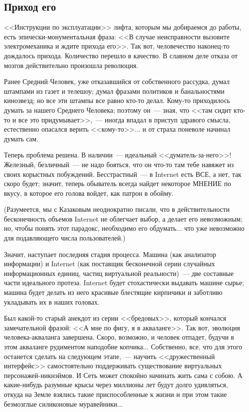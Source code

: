 \documentclass{scrbook}
\newcommand{\flqq}{<<}
\newcommand{\frqq}{>>}
\newcommand{\mdash}{~--- }
\newcommand{\commamdash}{~--- } %
\newcommand{\essaysection}[1]{\subsection*{#1}\nopagebreak}
\begin{document}
\essaysection{Приход его}

{\flqq}Инструкции по эксплуатации{\frqq} лифта, которым мы добираемся до работы, есть эпически-монументальная фраза: {\flqq}В случае неисправности вызовите электромеханика и ждите прихода его{\frqq}. Так вот, человечество наконец-то дождалось прихода. Количество перешло в качество. В славном деле отказа от мозгов действительно произошла революция.

Ранее Средний Человек, уже отказавшийся от собственного рассудка, думал штампами из газет и телешоу; думал фразами политиков и банальностями кинозвезд; но все эти штампы все равно кто-то делал. Кому-то приходилось думать за нашего Среднего Человека; поэтому он{\mdash}зная, что {\flqq}там сидит кто-то и все это придумывает{\frqq},{\commamdash}иногда впадал в приступ здравого смысла, естественно опасался верить {\flqq}кому-то{\frqq}... и от страха поневоле начинал думать сам.

Теперь проблема решена. В наличии{\mdash}идеальный {\flqq}думатель-за-него{\frqq}! Железный, безличный{\mdash}не надо бояться, что он что-то там тебе навяжет из своих корыстных побуждений. Бесстрастный{\mdash}в Internet есть ВСЕ, а нет, так скоро будет; значит, теперь обыватель всегда найдет некоторое МНЕНИЕ по вкусу, в которое его голова войдет, как патрон в обойму.

(Разумеется, мы с Казаковым неоднократно писали, что в действительности бесконечность объемов Internet не облегчает выбор, а делает его невозможным; но, чтобы понять этот парадокс, необходимо его обдумать... что уже невозможно для подавляющего числа пользователей.)

Значит, наступает последняя стадия процесса. Машина (как анализатор информации) и Internet (как поставщик бесконечной серии случайных информационных единиц, частиц виртуальной реальности){\mdash}две составные части идеального протеза. Internet будет стохастически выдавать машине сырье; машина будет делать из него красивые блестящие кирпичики и заботливо укладывать их в наших головах.

Был какой-то старый анекдот из серии {\flqq}бредовых{\frqq}, который кончался замечательной фразой: {\flqq}А мне по фигу, я в акваланге{\frqq}. Так вот, эволюция человека-акваланга завершена. Скоро, возможно, и человек отпадет, будучи в этом акваланге рудиментом наподобие копчика... Собственно, все, что для этого останется сделать на следующем этапе,{\commamdash}научить {\flqq}дружественный интерфейс{\frqq} самостоятельно поддерживать существование виртуальных персонажей-никнэймов. И Сеть может спокойно начинать жить сама с собою. А какие-нибудь разумные крысы через миллионы лет будут долго удивляться, откуда на Земле взялись такие приспособленные к жизни и при этом такие безмозглые силиконовые муравейники...
\end{document}
